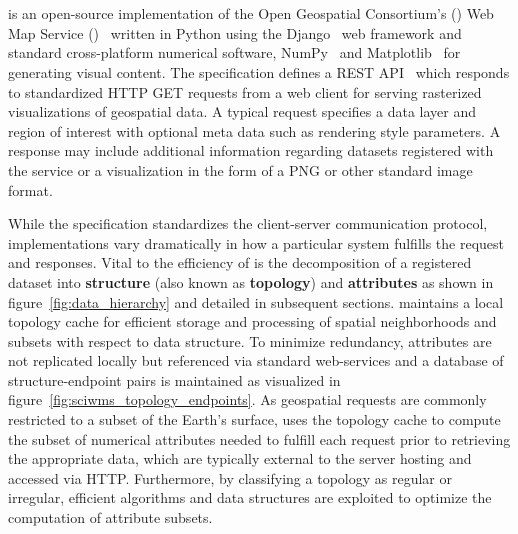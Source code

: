 \section{\sciwms{}}
\label{sec:sciwms}
\Sciwms{} is an open-source implementation of the Open Geospatial
Consortium's (\ogc{}) Web Map Service (\wms{})~\cite{wms14} written in
Python using the Django~\cite{django} web framework and standard
cross-platform numerical software, NumPy~\cite{numpy11} and
Matplotlib~\cite{hunter07} for generating visual content. The \wms{}
specification defines a REST API~\cite{Fielding02} which responds to
standardized HTTP GET requests from a web client for serving
rasterized visualizations of geospatial data. A typical \wms{} request
specifies a data layer and region of interest with optional meta data
such as rendering style parameters. A \wms{} response may include
additional information regarding datasets registered with
the service or a visualization in the form of a PNG or other standard
image format.

While the \ogc{} \wms{} specification standardizes the client-server
communication protocol, \wms{} implementations vary dramatically in
how a particular system fulfills the \wms{} request and
responses. Vital to the efficiency of \sciwms{} is the decomposition
of a registered dataset into \textbf{structure} (also known as
\textbf{topology}) and \textbf{attributes} as shown in
figure~\ref{fig:data_hierarchy} and detailed in subsequent
sections. \Sciwms{} maintains a local topology cache for efficient
storage and processing of spatial neighborhoods and subsets with
respect to data structure. To minimize redundancy, attributes are not
replicated locally but referenced via standard web-services and a
database of structure-endpoint pairs is maintained as visualized in
figure~\ref{fig:sciwms_topology_endpoints}. As geospatial \wms{}
requests are commonly restricted to a subset of the Earth's surface,
\sciwms{} uses the topology cache to compute the subset of numerical
attributes needed to fulfill each request prior to retrieving the
appropriate data, which are typically external to the server hosting
\sciwms{} and accessed via HTTP. Furthermore, by classifying a
topology as regular or irregular, efficient algorithms and data
structures are exploited to optimize the computation of attribute
subsets.
